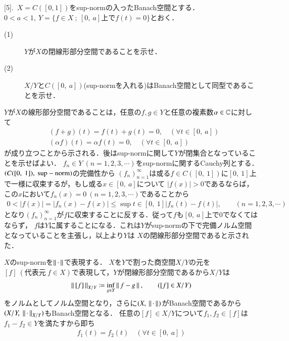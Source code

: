 [5].\ $X=C([0,1])$をsup-normの入ったBanach空間とする．$0 < a <1,\ Y=\{f \in X\ ;\ [0,\ a]\mbox{上で}f(t)=0\}$とおく．
\begin{description}
	\item[(1)] $Y$が$X$の閉線形部分空間であることを示せ．
	\item[(2)] $X/Y$と$C([0,\ a])$(sup-normを入れる)はBanach空間として同型であることを示せ．
\end{description}

\begin{prf}
\begin{description}\mbox{}
	\item[(1)]
		$Y$が$X$の線形部分空間であることは，任意の$f,g \in Y$と任意の複素数$\alpha \in \mathbb{C}$に対して
		\begin{align}
			&(f+g)(t) = f(t) + g(t) = 0, \quad (\forall t \in [0,\ a]) \\
			&(\alpha f) (t) = \alpha f(t) = 0, \quad (\forall t \in [0,\ a])
		\end{align}
		が成り立つことから示される．後はsup-normに関して$Y$が閉集合となっていることを示せばよい．
		$f_n \in Y\ (n=1,2,3,\cdots)$をsup-normに関するCauchy列とする．$(C([0,\ 1]),\ \rm{sup-norm})$の完備性から
		$(f_n)_{n=1}^{\infty}$は或る$f \in C([0,\ 1])$に$[0,\ 1]$上で一様に収束するが，もし或る$x \in [0,\ a]$について
		$|f(x)| > 0$であるならば，この$x$において$f_n(x)=0\ (n=1,2,3,\cdots)$であることから
		\begin{align}
			0 < |f(x)| = |f_n(x) - f(x)| \leq \sup{t \in [0,\ 1]}{|f_n(t) - f(t)|}, \qquad (n=1,2,3,\cdots)
		\end{align}
		となり$(f_n)_{n=1}^{\infty}$が$f$に収束することに反する．従って$f$も$[0,\ a]$上で0でなくてはならず，
		$f$は$Y$に属することになる．これは$Y$がsup-normの下で完備ノルム空間となっていることを主張し，以上より$Y$は
		$X$の閉線形部分空間であると示された．
	\item[(2)]
		$X$のsup-normを$\left\|\, \cdot\, \right\|_{}$で表現する．
		$X$を$Y$で割った商空間$X/Y$の元を$[f]\ (\mbox{代表元}\ f \in X)$で表現して，$Y$が閉線形部分空間であるから$X/Y$は
		\begin{align}
			\left\|\, [f]\, \right\|_{X/Y} \coloneqq \operatorname*{inf}_{g \in Y} \left\|\, f - g\, \right\|_{},\qquad ([f] \in X/Y)
		\end{align}
		をノルムとしてノルム空間となり，さらに$(X,\ \Norm{\cdot}{})$がBanach空間であるから$(X/Y,\ \Norm{\cdot}{X/Y})$もBanach空間となる．
		任意の$[f] \in X/Y$について$f_1, f_2 \in [f]$は$f_1 - f_2 \in Y$を満たすから即ち
		\begin{align}
			f_1(t) = f_2(t) \quad (\forall t \in [0,\ a])

\end{align}
\end{description}
\end{prf}
